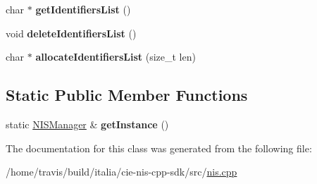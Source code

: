 \begin{DoxyCompactItemize}
\item 
\hypertarget{classNISManager_a713e9399922ebfdb0b5bbe5fee8f1bc3}{char $\ast$ {\bfseries get\-Identifiers\-List} ()}\label{classNISManager_a713e9399922ebfdb0b5bbe5fee8f1bc3}

\item 
\hypertarget{classNISManager_a56879726595d8357c09ecafe5cb074e3}{void {\bfseries delete\-Identifiers\-List} ()}\label{classNISManager_a56879726595d8357c09ecafe5cb074e3}

\item 
\hypertarget{classNISManager_ab55cd1e722e46885664f52eb883e2ead}{char $\ast$ {\bfseries allocate\-Identifiers\-List} (size\-\_\-t len)}\label{classNISManager_ab55cd1e722e46885664f52eb883e2ead}

\end{DoxyCompactItemize}
\subsection*{Static Public Member Functions}
\begin{DoxyCompactItemize}
\item 
\hypertarget{classNISManager_af6a7f2cb644fe38ef43b2ed9323506c7}{static \hyperlink{classNISManager}{N\-I\-S\-Manager} \& {\bfseries get\-Instance} ()}\label{classNISManager_af6a7f2cb644fe38ef43b2ed9323506c7}

\end{DoxyCompactItemize}


The documentation for this class was generated from the following file\-:\begin{DoxyCompactItemize}
\item 
/home/travis/build/italia/cie-\/nis-\/cpp-\/sdk/src/\hyperlink{nis_8cpp}{nis.\-cpp}\end{DoxyCompactItemize}

